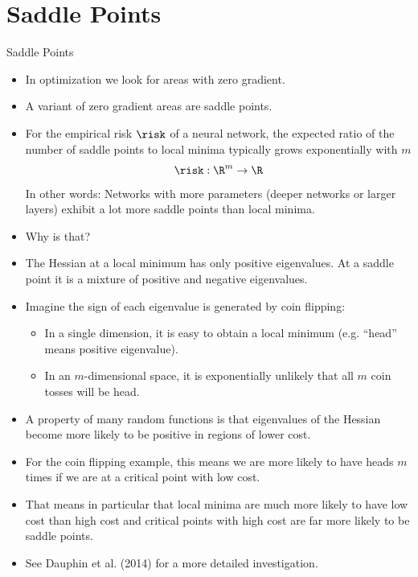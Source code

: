 \section{Saddle Points}
\begin{vbframe}{Saddle Points}
  \begin{itemize}
    \item In optimization we look for areas with zero gradient.
    \item A variant of zero gradient areas are saddle points.
    \item For the empirical risk $\risk$ of a neural network, the expected ratio of the number of saddle points to local minima typically grows exponentially with $m$ 
    $$\risk: \R^m \rightarrow \R$$ 
    In other words: Networks with more parameters (deeper networks or larger layers) exhibit a lot more saddle points than local minima.
     \item Why is that?
    \item The Hessian at a local minimum has only positive eigenvalues. At a saddle point it is a mixture of positive and negative eigenvalues.
    
\framebreak
    
    \item Imagine the sign of each eigenvalue is generated by coin flipping:
    \begin{itemize}
      \item In a single dimension, it is easy to obtain a local minimum (e.g. \enquote{head} means positive eigenvalue).
      \item In an $m$-dimensional space, it is exponentially unlikely that all $m$ coin tosses will be head.
    \end{itemize}
    \item A property of many random functions is that eigenvalues of the Hessian become more likely to be positive in regions of lower cost.
    \item For the coin flipping example, this means we are more likely to have heads $m$ times if we are at a critical point with low cost.
    \item That means in particular that local minima are much more likely to have low cost than high cost and critical points with high cost are far more likely to be saddle points.
    \item See Dauphin et al. (2014) for a more detailed investigation.
    
\framebreak
    

\end{itemize}
\end{vbframe}
